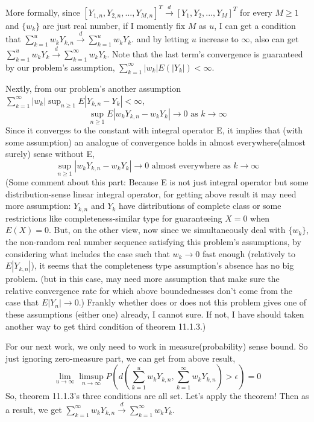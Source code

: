 \documentclass{article}
\begin{document}
More formally, since \([Y_{1,n},Y_{2,n},...,Y_{M,n}]^T\xrightarrow{d} [Y_1,Y_2,...,Y_M]^T\) for every $M\geq1$ and
$\{w_k\}$ are just real number,
if I momently fix $M$ as $u$, I can get a condition that \(\sum_{k=1}^{u}w_kY_{k,n}\xrightarrow{d}\sum_{k=1}^{u}w_kY_{k}\).
and by letting $u$ increase to $\infty$, also can get 
\(\sum_{k=1}^{u}w_kY_{k}\xrightarrow{d}\sum_{k=1}^{\infty}w_kY_{k}\).
Note that the last term's convergence is guaranteed by our problem's assumption, \(\sum_{k=1}^{\infty}|w_k| E(|Y_k|)<\infty\).

Nextly, from our problem's another assumption $\sum_{k=1}^{\infty}|w_k|\sup_{n\geq 1}E|Y_{k,n}-Y_k|<\infty$,
\[\sup_{n\geq 1}E|w_kY_{k,n}-w_kY_k|\rightarrow0 \text{ as } k\rightarrow\infty \]
Since it converges to the constant with integral operator E, 
it implies that (with some assumption) an analogue of convergence holds in almost everywhere(almost surely) sense without E,
\[\sup_{n\geq 1}|w_kY_{k,n}-w_kY_k| \rightarrow 0 \text{ almost everywhere as } k\rightarrow\infty \]
(Some comment about this part: Because E is not just integral operator but some distribution-sense linear integral operator, 
for getting above result it may need more assumption: 
$Y_{k,n}$ and $Y_k$ have distributions of complete class or some restrictions like completeness-similar type for guaranteeing $X=0$ when $E(X)=0$.
But, on the other view, now since we simultaneously deal with $\{w_k\}$, the non-random real number sequence satisfying this problem's assumptions,
by considering what includes the case such that $w_k\rightarrow0$ fast enough (relatively to $E|Y_{k,n}|$), 
it seems that the completeness type assumption's absence has no big problem. (but in this case, may need more assumption that make sure the relative convergence rate
for which above boundednesses don't come from the case that $E|Y_n|\rightarrow0$.)
Frankly whether does or does not this problem gives one of these assumptions (either one) already, I cannot sure.
If not, I have should taken another way to get third condition of theorem 11.1.3.)

For our next work, we only need to work in measure(probability) sense bound.
So just ignoring zero-measure part, we can get from above result,
\[\lim_{u\rightarrow\infty}\limsup_{n\rightarrow\infty}P(d(\sum_{k=1}^{u}w_kY_{k,n},\sum_{k=1}^{\infty}w_kY_{k,n})>\epsilon)=0\]
So, theorem 11.1.3's three conditions are all set. Let's apply the theorem! 
Then as a result, we get
\(\sum_{k=1}^{\infty}w_kY_{k,n}\xrightarrow{d}\sum_{k=1}^{\infty}w_kY_k\).
\end{document}
